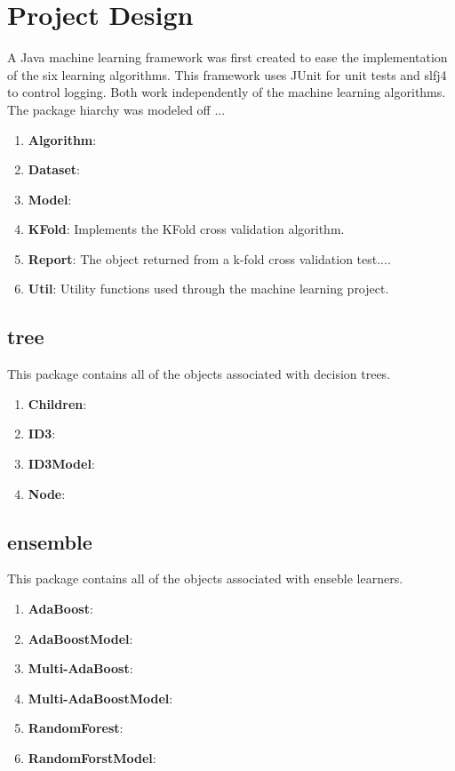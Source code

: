\documentclass[11pt]{article}
\newcommand{\bb}{\textbf}
\begin{document}
\section{Project Design}
A Java machine learning framework was first created to ease the implementation of the six learning algorithms. This framework uses JUnit for unit tests and slfj4 to control logging. Both work independently of the machine learning algorithms. The package hiarchy was modeled off ...

\begin{enumerate}[leftmargin=*]
  \item[] \bb{Algorithm}:
  \item[] \bb{Dataset}:
  \item[] \bb{Model}:
  \item[] \bb{KFold}: Implements the KFold cross validation algorithm.
  \item[] \bb{Report}: The object returned from a k-fold cross validation test....
  \item[] \bb{Util}: Utility functions used through the machine learning project.
\end{enumerate}

\subsection{tree}
This package contains all of the objects associated with decision trees.

\begin{enumerate}[leftmargin=*]
  \item[] \bb{Children}:
  \item[] \bb{ID3}:
  \item[] \bb{ID3Model}:
  \item[] \bb{Node}:
\end{enumerate}

\subsection{ensemble}
This package contains all of the objects associated with enseble learners.

\begin{enumerate}[leftmargin=*]
  \item[] \bb{AdaBoost}:
  \item[] \bb{AdaBoostModel}:
  \item[] \bb{Multi-AdaBoost}:
  \item[] \bb{Multi-AdaBoostModel}:
  \item[] \bb{RandomForest}:
  \item[] \bb{RandomForstModel}:
\end{enumerate}
\end{document}
